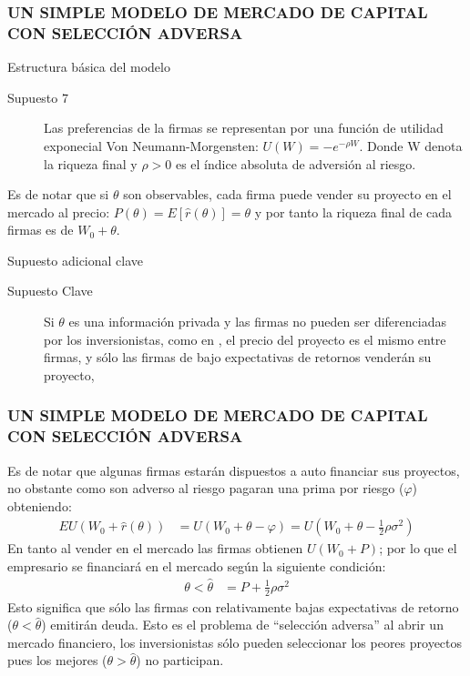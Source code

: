 \documentclass[10pt, xcolor=table, x11names]{beamer}
\begin{document}
\begin{frame}
    \frametitle{{\normalsize UN SIMPLE MODELO DE MERCADO DE CAPITAL CON SELECCIÓN ADVERSA} {}}
    
    \begin{block} {Estructura básica del modelo}
        \begin{description}
           \item[Supuesto 7]  Las preferencias de la firmas se representan por una función de utilidad exponecial Von Neumann-Morgensten: $U(W)=-e^{-\rho W}  $. Donde W denota la riqueza final y $\rho>0$ es el índice absoluta de adversión al riesgo.
        \end{description}   
    \end{block}	
    Es de notar que si $\theta $ son observables, cada firma puede vender su proyecto en el mercado al precio: $P(\theta)=E[\hat{r}(\theta)]=\theta $ y por tanto la riqueza final de cada firmas es de $W_{0}+\theta$.\\
    \begin{block} {Supuesto adicional clave}
        \begin{description}
            \item[Supuesto Clave] Si $\theta$ es una información privada y las firmas no pueden ser diferenciadas por los inversionistas, como en \cite{Akerlof1970}, el precio del proyecto es el mismo entre firmas, y sólo las firmas de bajo expectativas de retornos venderán su proyecto,\\  
        \end{description}   
    \end{block}	
    
\end{frame}


\begin{frame}
    \frametitle{{\normalsize UN SIMPLE MODELO DE MERCADO DE CAPITAL CON SELECCIÓN ADVERSA} {}}
  Es de notar que algunas firmas estarán dispuestos a auto financiar sus proyectos, no obstante como son adverso al riesgo pagaran una prima por riesgo ($\varphi$) obteniendo:
    \begin{align}
    EU(W_{0}+\hat{r}(\theta))&=U(W_{0}+\theta-\varphi)=U(W_{0}+\theta-\frac{1}{2}\rho\sigma^{2})\nonumber
    \end{align}
  En tanto al vender en el mercado las firmas obtienen $ U(W_{0}+P)$; por lo que el empresario se financiará en el mercado según la siguiente condición:
    \begin{align}
  \theta<\hat{\theta}&=P+\frac{1}{2}\rho\sigma^{2}
  \end{align}
  Esto significa que sólo las firmas con relativamente bajas expectativas de retorno ($\theta<\hat{\theta}$) emitirán deuda. Esto es el problema de ``selección adversa'' al abrir un mercado financiero, los inversionistas sólo pueden seleccionar los peores proyectos pues los mejores ($\theta>\hat{\theta}$)  no participan.
\end{frame}
\end{document}

